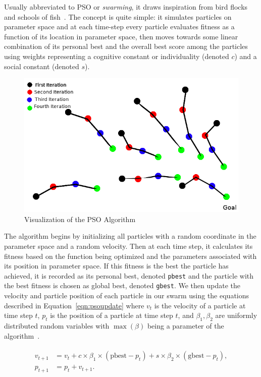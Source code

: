 \documentclass[oneside,12pt,openany]{book}
\begin{document}
	Usually abbreviated to PSO or \textit{swarming}, it draws inspiration from bird flocks and schools of fish~\cite{Eberhart}. The concept is quite simple: it simulates particles on parameter space and at each time-step every particle evaluates fitness as a function of its location in parameter space, then moves towards some linear combination of its personal best and the overall best score among the particles using weights representing a cognitive constant or individuality (denoted $c$) and a social constant (denoted $s$).
	
	\begin{figure}[hbt!]
		\centering
		\includegraphics[width=.7\linewidth]{images/PSOVisual.png}
		\caption{Visualization of the PSO Algorithm}
		\label{fig:PSOVisual}
	\end{figure}
	
	The algorithm begins by initializing all particles with a random coordinate in the parameter space and a random velocity. Then at each time step, it calculates its fitness based on the function being optimized and the parameters associated with its position in parameter space. If this fitness is the best the particle has achieved, it is recorded as its personal best, denoted \texttt{pbest} and the particle with the best fitness is chosen as global best, denoted \texttt{gbest}. We then update the velocity and particle position of each particle in our swarm using the equations described in Equation~\eqref{eqn:psoupdate} where $v_{t}$ is the velocity of a particle at time step $t$, $p_{t}$ is the position of a particle at time step $t$, and $\beta_{1}, \beta_{2}$ are uniformly distributed random variables with $\max(\beta)$ being a parameter of the algorithm~\cite{PSOReview}.
	
	\begin{align}
	\label{eqn:psoupdate}
	\begin{split}
	v_{t+1} &= v_{t}+c\times \beta_{1} \times (\text{pbest}-p_{t})+s\times \beta_{2} \times (\text{gbest}-p_{t}), \\
	p_{t+1} &= p_{t} + v_{t+1} .
	\end{split}
	\end{align}
	
\end{document}
